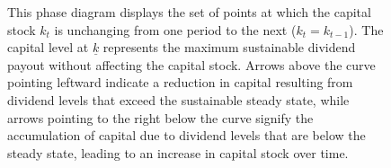 \documentclass[12pt]{report}
\begin{document}
\begin{figure}
    \centering
    \caption{This phase diagram displays the set of points at which the capital stock \( k_t \) is
    unchanging from one period to the next (\( k_t = k_{t-1} \)). The capital level at \( \underline{k} \) represents the
    maximum sustainable dividend payout without affecting the capital stock. Arrows above the curve pointing leftward
    indicate a reduction in capital resulting from dividend levels that exceed the sustainable steady state, while
    arrows pointing to the right below the curve signify the accumulation of capital due to dividend levels that are
    below the steady state, leading to an increase in capital stock over time. 
    }
    \label{fig:ph_d_k_nod}
\end{figure}
\end{document}
